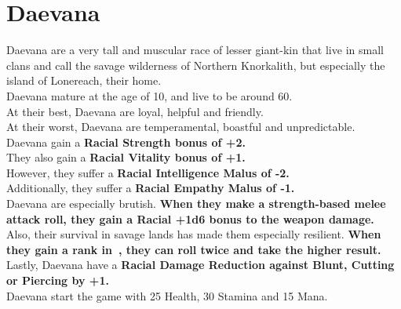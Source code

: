 \section{Daevana}\label{race:daevana}
Daevana are a very tall and muscular race of lesser giant-kin that live in small clans and call the savage wilderness of Northern Knorkalith, but especially the island of Lonereach, their home.\\
Daevana mature at the age of 10, and live to be around 60.\\
At their best, Daevana are loyal, helpful and friendly.\\
At their worst, Daevana are temperamental, boastful and unpredictable.\\
Daevana gain a \textbf{Racial Strength bonus of +2.}\\
They also gain a \textbf{Racial Vitality bonus of +1.}\\
However, they suffer a \textbf{Racial Intelligence Malus of -2.}\\
Additionally, they suffer a \textbf{Racial Empathy Malus of -1.}\\
Daevana are especially brutish. \textbf{When they make a strength-based melee attack roll, they gain a Racial +1d6 bonus to the weapon damage.}
Also, their survival in savage lands has made them especially resilient.
\textbf{When they gain a rank in~, they can roll twice and take the higher result.}\\
Lastly, Daevana have a \textbf{Racial Damage Reduction against Blunt, Cutting or Piercing by +1.}\\
Daevana start the game with 25 Health, 30 Stamina and 15 Mana.